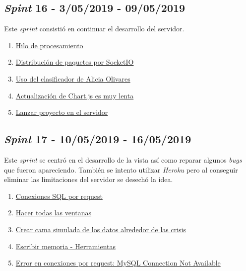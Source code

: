 \subsection{\textit{Spint} 16 - 3/05/2019 - 09/05/2019}
Este \textit{sprint} consistió en continuar el desarrollo del servidor.

\begin{enumerate}\addtocounter{enumi}{73}
	\item 
	\href{https://github.com/jlgarridol/TFG-SmartBeds/issues/74}{Hilo de procesamiento}
	\item 
	\href{https://github.com/jlgarridol/TFG-SmartBeds/issues/75}{Distribución de paquetes por SocketIO}
	\item 
	\href{https://github.com/jlgarridol/TFG-SmartBeds/issues/76}{Uso del clasificador de Alicia Olivares}
	\item 
	\href{https://github.com/jlgarridol/TFG-SmartBeds/issues/77}{Actualización de Chart.js es muy lenta}
	\item 
	\href{https://github.com/jlgarridol/TFG-SmartBeds/issues/78}{Lanzar proyecto en el servidor}
\end{enumerate}

\subsection{\textit{Spint} 17 - 10/05/2019 - 16/05/2019}
Este \textit{sprint} se centró en el desarrollo de la vista así como reparar algunos \textit{bugs} que fueron apareciendo. También se intento utilizar \textit{Heroku} pero al conseguir eliminar las limitaciones del servidor se desechó la idea.

\begin{enumerate}\addtocounter{enumi}{79}
	\item 
	\href{https://github.com/jlgarridol/TFG-SmartBeds/issues/80}{Conexiones SQL por request}
	\item 
	\href{https://github.com/jlgarridol/TFG-SmartBeds/issues/81}{Hacer todas las ventanas}
	\item 
	\href{https://github.com/jlgarridol/TFG-SmartBeds/issues/82}{Crear cama simulada de los datos alrededor de las crisis}
	\item 
	\href{https://github.com/jlgarridol/TFG-SmartBeds/issues/83}{Escribir memoria - Herramientas}
	\item 
	\href{https://github.com/jlgarridol/TFG-SmartBeds/issues/84}{Error en conexiones por request: MySQL Connection Not Available}
\end{enumerate}

